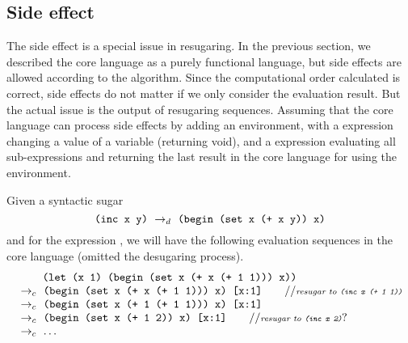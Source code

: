 \subsection{Side effect}


The side effect is a special issue in resugaring. In the previous section, we described the core language as a purely functional language, but side effects are allowed according to the algorithm. Since the computational order calculated is correct, side effects do not matter if we only consider the evaluation result. But the actual issue is the output of resugaring sequences. Assuming that the core language can process side effects by adding an environment, with a  expression changing a value of a variable (returning void), and a  expression evaluating all sub-expressions and returning the last result in the core language for using the environment.

Given a syntactic sugar
\[\texttt{(inc x y)} ~\rightarrow_d~ \texttt{(begin (set x (+ x y)) x)}\]
and for the expression , we will have the following evaluation sequences in the core language (omitted the desugaring process).
\[
	\begin{array}{l}
		\qquad\;\texttt{(let (x 1) (begin (set x (+ x (+ 1 1))) x))}\\
	~\rightarrow_c~\texttt{(begin (set x (+ x (+ 1 1))) x) [x:1]} \qquad//{\scriptsize\emph{resugar to \texttt{(inc x (+ 1 1))}}}\\
	~\rightarrow_c~\texttt{(begin (set x (+ 1 (+ 1 1))) x) [x:1]} \\
	~\rightarrow_c~\texttt{(begin (set x (+ 1 2)) x) [x:1]} \qquad//{\scriptsize\emph{resugar to \texttt{(inc x 2)}}?}\\
	~\rightarrow_c~\ldots
	\end{array}
\]

